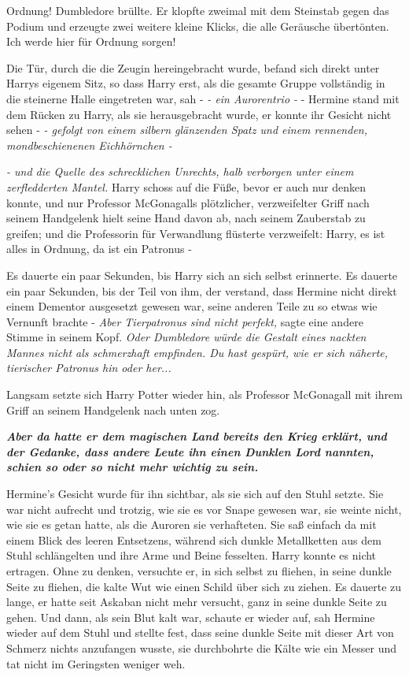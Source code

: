 \glqq{}Ordnung!\grqq{} Dumbledore brüllte. Er klopfte zweimal mit dem Steinstab
gegen das Podium und erzeugte zwei weitere kleine Klicks, die alle Geräusche
übertönten. \glqq{}Ich werde hier für Ordnung sorgen!\grqq{}

Die Tür, durch die die Zeugin hereingebracht wurde, befand sich direkt unter
Harrys eigenem Sitz, so dass Harry erst, als die gesamte Gruppe vollständig in
die steinerne Halle eingetreten war, sah - \emph{- ein Aurorentrio -} - Hermine
stand mit dem Rücken zu Harry, als sie herausgebracht wurde, er konnte ihr
Gesicht nicht sehen - \emph{- gefolgt von einem silbern glänzenden Spatz und
einem rennenden, mondbeschienenen Eichhörnchen -}

\emph{- und die Quelle des
schrecklichen Unrechts, halb verborgen unter einem zerfledderten Mantel.}
Harry schoss auf die Füße, bevor er auch nur denken konnte, und nur Professor
McGonagalls plötzlicher, verzweifelter Griff nach seinem Handgelenk hielt seine
Hand davon ab, nach seinem Zauberstab zu greifen; und die Professorin für
Verwandlung flüsterte verzweifelt: \glqq{}Harry, es ist alles in Ordnung, da ist
ein Patronus -\grqq{}

Es dauerte ein paar Sekunden, bis Harry sich an sich selbst erinnerte. Es
dauerte ein paar Sekunden, bis der Teil von ihm, der verstand, dass Hermine
nicht direkt einem Dementor ausgesetzt gewesen war, seine anderen Teile zu so
etwas wie Vernunft brachte - \emph{Aber Tierpatronus sind nicht perfekt,} sagte
eine andere Stimme in seinem Kopf. \emph{Oder Dumbledore würde die Gestalt eines
nackten Mannes nicht als schmerzhaft empfinden. Du hast gespürt, wie er sich
näherte, tierischer Patronus hin oder her...}

Langsam setzte sich Harry Potter wieder hin, als Professor McGonagall mit ihrem
Griff an seinem Handgelenk nach unten zog.

\textbf{\emph{Aber da hatte er dem
magischen Land bereits den Krieg erklärt, und der Gedanke, dass andere Leute ihn
einen Dunklen Lord nannten, schien so oder so nicht mehr wichtig zu sein.} }

Hermine's Gesicht wurde für ihn sichtbar, als sie sich auf den Stuhl setzte. Sie
war nicht aufrecht und trotzig, wie sie es vor Snape gewesen war, sie weinte
nicht, wie sie es getan hatte, als die Auroren sie verhafteten. Sie saß einfach
da mit einem Blick des leeren Entsetzens, während sich dunkle Metallketten aus
dem Stuhl schlängelten und ihre Arme und Beine fesselten. Harry konnte es nicht
ertragen. Ohne zu denken, versuchte er, in sich selbst zu fliehen, in seine
dunkle Seite zu fliehen, die kalte Wut wie einen Schild über sich zu ziehen. Es
dauerte zu lange, er hatte seit Askaban nicht mehr versucht, ganz in seine
dunkle Seite zu gehen. Und dann, als sein Blut kalt war, schaute er wieder auf,
sah Hermine wieder auf dem Stuhl und stellte fest, dass seine dunkle Seite mit
dieser Art von Schmerz nichts anzufangen wusste, sie durchbohrte die Kälte wie
ein Messer und tat nicht im Geringsten weniger weh.

